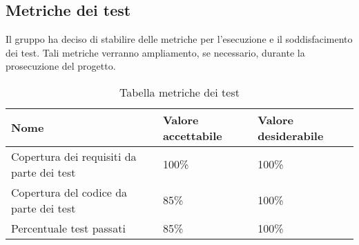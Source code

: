 \subsection{Metriche dei test}
Il gruppo ha deciso di stabilire delle metriche per l'esecuzione e il soddisfacimento dei test. Tali metriche verranno ampliamento, se necessario, durante la prosecuzione del progetto.


{

\centering
\renewcommand{\arraystretch}{2}
\begin{longtable}{C{8.7cm} C{3cm} C{3cm}}
\caption{Tabella metriche dei test}\\
\textbf{Nome} &
\textbf{Valore accettabile}&
\textbf{Valore desiderabile}\\
\endhead


Copertura dei requisiti da parte dei test & 100\% & 100\%\\
Copertura del codice da parte dei test & 85\% & 100\%\\
Percentuale test passati & 85\% & 100\%\\


\end{longtable}
}
